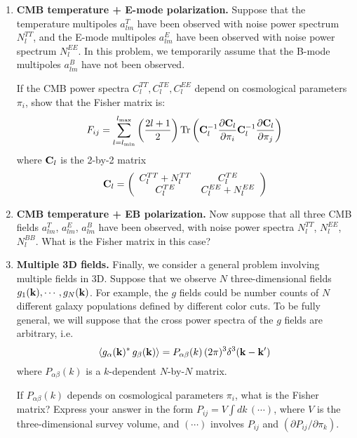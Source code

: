 \documentclass[aps,prd,superscriptaddress,groupedaddress,nofootinbib,nobibnotes]{revtex4}
\newcommand{\be}{\begin{equation}}
\newcommand{\ee}{\end{equation}}
\def\k{{\bf k}}
\begin{document}
\begin{enumerate}
\setcounter{enumi}{\value{enumi_save}}

\item {\bf CMB temperature + E-mode polarization.}
Suppose that the temperature multipoles $a_{lm}^T$ have been observed with noise power spectrum $N_l^{TT}$,
and the E-mode multipoles $a_{lm}^E$ have been observed with noise power spectrum $N_l^{EE}$.
In this problem, we temporarily assume that the B-mode multipoles $a_{lm}^B$ have not been observed.

If the CMB power spectra $C_l^{TT}, C_l^{TE}, C_l^{EE}$ depend on cosmological parameters $\pi_i$,
show that the Fisher matrix is:
\be
F_{ij} = \sum_{l=l_{\rm min}}^{l_{\rm max}} \left( \frac{2l+1}{2} \right) 
   \mbox{Tr}\left( {\bf C}^{-1}_l \frac{\partial {\bf C}_l}{\partial \pi_i} {\bf C}^{-1}_l \frac{\partial {\bf C}_l}{\partial \pi_j} \right)
\ee
where ${\bf C}_l$ is the 2-by-2 matrix
\be
{\bf C}_l = \left( \begin{array}{cc}
 C_l^{TT} + N_l^{TT} & C_l^{TE} \\
  C_l^{TE} & C_l^{EE} + N_l^{EE}
\end{array} \right)
\ee

\item {\bf CMB temperature + EB polarization.}
Now suppose that all three CMB fields $a_{lm}^T$, $a_{lm}^E$, $a_{lm}^B$ have been observed,
with noise power spectra $N_l^{TT}$, $N_l^{EE}$, $N_l^{BB}$.  What is the Fisher matrix
in this case?

\item {\bf Multiple 3D fields.}
Finally, we consider a general problem involving multiple fields in 3D.
Suppose that we observe $N$ three-dimensional fields $g_1(\k), \cdots, g_N(\k)$.
For example, the $g$ fields could be number counts of $N$ different galaxy populations
defined by different color cuts.
To be fully general, we will suppose that the cross power spectra of the $g$ fields are
arbitrary, i.e.
\be
\langle g_\alpha(\k)^* \, g_\beta(\k) \rangle = P_{\alpha\beta}(k) \, (2\pi)^3 \delta^3(\k-\k')
\ee
where $P_{\alpha\beta}(k)$ is a $k$-dependent $N$-by-$N$ matrix.

If $P_{\alpha\beta}(k)$ depends on cosmological parameters $\pi_i$, what is the Fisher matrix?
Express your answer in the form $P_{ij} = V \int dk \, (\cdots)$, where $V$ is the
three-dimensional survey volume, and $(\cdots)$ involves $P_{ij}$ and $(\partial P_{ij}/\partial \pi_k)$.

\end{enumerate}
\end{document}
